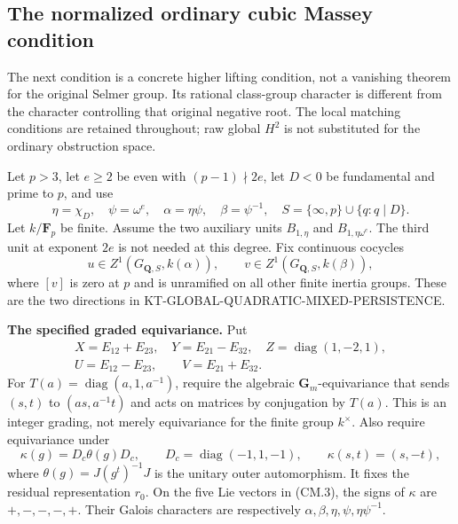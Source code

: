 \documentclass[11pt,a4paper]{article}
\theoremstyle{definition}
\renewcommand{\paragraph}[1]{\par\smallskip\noindent\textbf{#1}\quad\ignorespaces}
\begin{document}
\subsection{The normalized ordinary cubic Massey condition}
\label{sec:kt-cubic-massey-condition}

The next condition is a concrete higher lifting condition, not a
vanishing theorem for the original Selmer group.  Its rational
class-group character is different from the character controlling
that original negative root.  The local matching conditions are
retained throughout; raw global $H^2$ is not substituted for the
ordinary obstruction space.

Let $p>3$, let $e\ge2$ be even with $(p-1)\nmid2e$, let
$D<0$ be fundamental and prime to $p$, and use
\[
 \eta=\chi_D,\quad \psi=\omega^e,\quad
 \alpha=\eta\psi,\quad\beta=\psi^{-1},\quad
 S=\{\infty,p\}\cup\{q:q\mid D\}.
                                                               \tag{CM.1}
\]
Let $k/\mathbf F_p$ be finite.  Assume the two auxiliary units
$B_{1,\eta}$ and $B_{1,\eta\omega^e}$.
The third unit at exponent $2e$ is not needed at this degree.
Fix continuous cocycles
\[
 u\in Z^1(G_{\mathbf Q,S},k(\alpha)),\qquad
 v\in Z^1(G_{\mathbf Q,S},k(\beta)),
                                                               \tag{CM.2}
\]
where $[v]$ is zero at $p$ and is unramified on all other finite
inertia groups.  These are the two directions in
KT-GLOBAL-QUADRATIC-MIXED-PERSISTENCE.

\paragraph{The specified graded equivariance.}
Put
\[
\begin{gathered}
 X=E_{12}+E_{23},\quad Y=E_{21}-E_{32},\quad
 Z=\operatorname{diag}(1,-2,1),\\
 U=E_{12}-E_{23},\qquad V=E_{21}+E_{32}.
\end{gathered}                                                 \tag{CM.3}
\]
For $T(a)=\operatorname{diag}(a,1,a^{-1})$, require the algebraic
$\mathbf G_m$-equivariance that sends $(s,t)$ to $(as,a^{-1}t)$
and acts on matrices by conjugation by $T(a)$.  This is an
integer grading, not merely equivariance for the finite group
$k^\times$.  Also require equivariance under
\[
 \kappa(g)=D_c\theta(g)D_c,\qquad
 D_c=\operatorname{diag}(-1,1,-1),\qquad
 \kappa(s,t)=(s,-t),                                    \tag{CM.4}
\]
where $\theta(g)=J(g^t)^{-1}J$ is the unitary outer automorphism.
It fixes the residual representation $r_0$.
On the five Lie vectors in (CM.3), the signs of $\kappa$ are
$+,-,-,-,+$.  Their Galois characters are respectively
$\alpha,\beta,\eta,\psi,\eta\psi^{-1}$.
\end{document}
